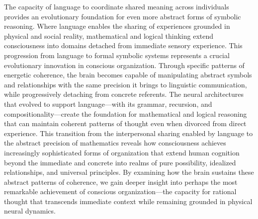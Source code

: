 The capacity of language to coordinate shared meaning across individuals provides an evolutionary foundation for even more abstract forms of symbolic reasoning. Where language enables the sharing of experiences grounded in physical and social reality, mathematical and logical thinking extend consciousness into domains detached from immediate sensory experience. This progression from language to formal symbolic systems represents a crucial evolutionary innovation in conscious organization. Through specific patterns of energetic coherence, the brain becomes capable of manipulating abstract symbols and relationships with the same precision it brings to linguistic communication, while progressively detaching from concrete referents. The neural architectures that evolved to support language—with its grammar, recursion, and compositionality—create the foundation for mathematical and logical reasoning that can maintain coherent patterns of thought even when divorced from direct experience. This transition from the interpersonal sharing enabled by language to the abstract precision of mathematics reveals how consciousness achieves increasingly sophisticated forms of organization that extend human cognition beyond the immediate and concrete into realms of pure possibility, idealized relationships, and universal principles. By examining how the brain sustains these abstract patterns of coherence, we gain deeper insight into perhaps the most remarkable achievement of conscious organization—the capacity for rational thought that transcends immediate context while remaining grounded in physical neural dynamics.
